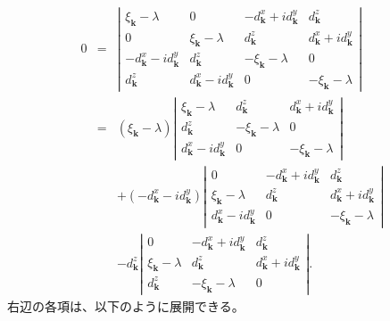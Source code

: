 \documentclass[uplatex,a4j,12pt,dvipdfmx]{jsarticle}
\begin{document}
\begin{eqnarray}
	0
	&=&
	\left|
	\begin{array}{cccc}
		{\xi_{\bm{k}}} - \lambda                & 0                                      & - {d^{x}_{\bm{k}}} + i{d^{y}_{\bm{k}}} & {d^{z}_{\bm{k}}}                      \\[2mm]
		0                                        & {\xi_{\bm{k}}} - \lambda              & {d^{z}_{\bm{k}}}                        & {d^{x}_{\bm{k}}} + i{d^{y}_{\bm{k}}} \\[2mm]
		- {d^{x}_{\bm{k}}} - i{d^{y}_{\bm{k}}} & {d^{z}_{\bm{k}}}                      & - {\xi_{\bm{k}}} -\lambda               & 0                                      \\[2mm]
		{d^{z}_{\bm{k}}}                        & {d^{x}_{\bm{k}}} - i{d^{y}_{\bm{k}}} & 0                                        & - {\xi_{\bm{k}}} -\lambda
	\end{array}
	\right|
	\nonumber \\[3mm] &=&
	({\xi_{\bm{k}}} - \lambda)
	\left|
	\begin{array}{ccc}
		{\xi_{\bm{k}}} - \lambda              & {d^{z}_{\bm{k}}}          & {d^{x}_{\bm{k}}} + i{d^{y}_{\bm{k}}} \\[2mm]
		{d^{z}_{\bm{k}}}                      & - {\xi_{\bm{k}}} -\lambda & 0                                      \\[2mm]
		{d^{x}_{\bm{k}}} - i{d^{y}_{\bm{k}}} & 0                          & - {\xi_{\bm{k}}} -\lambda
	\end{array}
	\right|
	\nonumber \\[3mm] && +
	(- {d^{x}_{\bm{k}}} - i{d^{y}_{\bm{k}}})
	\left|
	\begin{array}{ccc}
		0                                      & - {d^{x}_{\bm{k}}} + i{d^{y}_{\bm{k}}} & {d^{z}_{\bm{k}}}                      \\[2mm]
		{\xi_{\bm{k}}} - \lambda              & {d^{z}_{\bm{k}}}                        & {d^{x}_{\bm{k}}} + i{d^{y}_{\bm{k}}} \\[2mm]
		{d^{x}_{\bm{k}}} - i{d^{y}_{\bm{k}}} & 0                                        & - {\xi_{\bm{k}}} -\lambda
	\end{array}
	\right|
	\nonumber \\[3mm] && -
	{d^{z}_{\bm{k}}}
	\left|
	\begin{array}{ccc}
		0                         & - {d^{x}_{\bm{k}}} + i{d^{y}_{\bm{k}}} & {d^{z}_{\bm{k}}}                      \\[2mm]
		{\xi_{\bm{k}}} - \lambda & {d^{z}_{\bm{k}}}                        & {d^{x}_{\bm{k}}} + i{d^{y}_{\bm{k}}} \\[2mm]
		{d^{z}_{\bm{k}}}         & - {\xi_{\bm{k}}} -\lambda               & 0
	\end{array}
	\right|
	.
\end{eqnarray}
%
右辺の各項は、以下のように展開できる。
\end{document}
